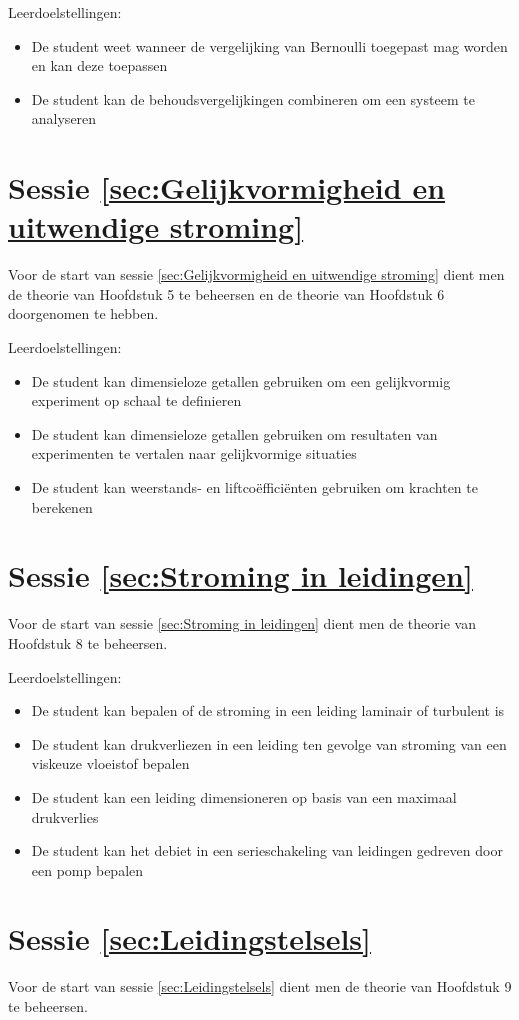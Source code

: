 Leerdoelstellingen:
\begin{itemize}
	\item De student weet wanneer de vergelijking van Bernoulli toegepast mag worden en kan deze toepassen
	\item De student kan de behoudsvergelijkingen combineren om een systeem te analyseren
\end{itemize}

	\section*{Sessie \ref{sec:Gelijkvormigheid en uitwendige stroming}}
Voor de start van sessie \ref{sec:Gelijkvormigheid en uitwendige stroming} dient men de theorie van Hoofdstuk 5 te beheersen en de theorie van Hoofdstuk 6 doorgenomen te hebben.

Leerdoelstellingen:
\begin{itemize}
	\item De student kan dimensieloze getallen gebruiken om een gelijkvormig experiment op schaal te definieren
	\item De student kan dimensieloze getallen gebruiken om resultaten van experimenten te vertalen naar gelijkvormige situaties
	\item De student kan weerstands- en liftcoëfficiënten gebruiken om krachten te berekenen
\end{itemize}

	\section*{Sessie \ref{sec:Stroming in leidingen}}
Voor de start van sessie \ref{sec:Stroming in leidingen} dient men de theorie van Hoofdstuk 8 te beheersen.

Leerdoelstellingen:
\begin{itemize}
	\item De student kan bepalen of de stroming in een leiding laminair of turbulent is
	\item De student kan drukverliezen in een leiding ten gevolge van stroming van een viskeuze vloeistof bepalen
	\item De student kan een leiding dimensioneren op basis van een maximaal drukverlies
	\item De student kan het debiet in een serieschakeling van leidingen gedreven door een pomp bepalen
\end{itemize}

	\section*{Sessie \ref{sec:Leidingstelsels}}
Voor de start van sessie \ref{sec:Leidingstelsels} dient men de theorie van Hoofdstuk 9 te beheersen.

